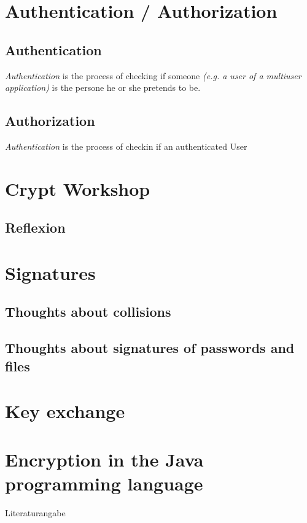 \documentclass[11pt,twoside,a4paper]{article}
\begin{document}
\section{Authentication / Authorization}
\subsection{Authentication}

\textit{Authentication} is the process of checking if someone \textit{(e.g. a user of a multiuser application)} is the persone he or she pretends to be.

\subsection{Authorization}

\textit{Authentication} is the process of checkin if an authenticated User

\section{Crypt Workshop}
\subsection{Reflexion}
\section{Signatures}
\subsection{Thoughts about collisions}
\subsection{Thoughts about signatures of passwords and files}
\section{Key exchange}
\section{Encryption in the Java programming language}
\begin{thebibliography}{3}
 Literaturangabe
\end{thebibliography}
\end{document}
